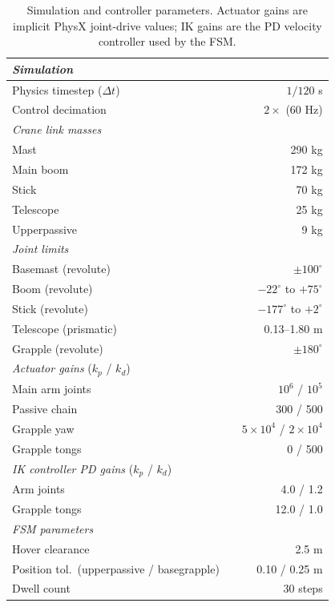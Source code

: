 \documentclass[conference]{IEEEtran}
\begin{document}
\begin{table}[t]
\centering
\caption{Simulation and controller parameters. Actuator gains are implicit PhysX joint-drive values; IK gains are the PD velocity controller used by the FSM.}
\label{tab:sim_params}
\setlength{\tabcolsep}{3pt}
\begin{tabular}{llr}
\toprule
\multicolumn{3}{l}{\textit{Simulation}} \\
\midrule
Physics timestep ($\Delta t$) & & $1/120$ s \\
Control decimation & & $2\times$ (60 Hz) \\
\midrule
\multicolumn{3}{l}{\textit{Crane link masses}} \\
\midrule
Mast & & 290 kg \\
Main boom & & 172 kg \\
Stick & & 70 kg \\
Telescope & & 25 kg \\
Upperpassive & & 9 kg \\
\midrule
\multicolumn{3}{l}{\textit{Joint limits}} \\
\midrule
Basemast (revolute) & & $\pm100^{\circ}$ \\
Boom (revolute) & & $-22^{\circ}$ to $+75^{\circ}$ \\
Stick (revolute) & & $-177^{\circ}$ to $+2^{\circ}$ \\
Telescope (prismatic) & & 0.13--1.80 m \\
Grapple (revolute) & & $\pm180^{\circ}$ \\
\midrule
\multicolumn{3}{l}{\textit{Actuator gains} ($k_p$ / $k_d$)} \\
\midrule
Main arm joints & & $10^{6}$ / $10^{5}$ \\
Passive chain & & 300 / 500 \\
Grapple yaw & & $5\!\times\!10^{4}$ / $2\!\times\!10^{4}$ \\
Grapple tongs & & 0 / 500 \\
\midrule
\multicolumn{3}{l}{\textit{IK controller PD gains} ($k_p$ / $k_d$)} \\
\midrule
Arm joints & & 4.0 / 1.2 \\
Grapple tongs & & 12.0 / 1.0 \\
\midrule
\multicolumn{3}{l}{\textit{FSM parameters}} \\
\midrule
Hover clearance & & 2.5 m \\
Position tol.\ (upperpassive / basegrapple) & & 0.10 / 0.25 m \\
Dwell count & & 30 steps \\

\end{tabular}
\end{table}
\end{document}
